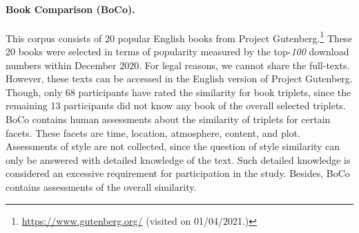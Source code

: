 \documentclass[11pt]{article}
\begin{document}
\paragraph{Book Comparison (BoCo).}
This corpus consists of 20 popular English books from Project Gutenberg.\footnote{\url{https://www.gutenberg.org/} (visited on 01/04/2021.)}
These 20 books were selected in terms of popularity measured by the top-\textit{100} download numbers within December 2020.
For legal reasons, we cannot share the full-texts. 
However, these texts can be accessed in the English version of Project Gutenberg. 
Though, only 68 participants have rated the similarity for book triplets, since the remaining 13 participants did not know any book of the overall selected triplets.
BoCo contains human assessments about the similarity of triplets for certain facets.
These facets are time, location, atmosphere, content, and plot. 
Assessments of style are not collected, since the question of style similarity can only be answered with detailed knowledge of the text.
Such detailed knowledge is considered an excessive requirement for participation in the study.
Besides, BoCo contains assessments of the overall similarity.
\end{document}
